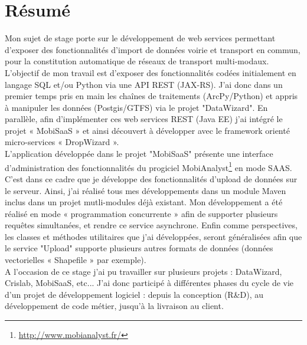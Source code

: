 \chapter*{Résumé}\label{Resume}

Mon sujet de stage porte sur le développement de web services permettant d’exposer des fonctionnalités d’import de données voirie et transport en commun, pour la constitution automatique de réseaux de transport multi-modaux. \\

L'objectif de mon travail est d'exposer des fonctionnalités codées initialement en langage SQL et/ou Python via une API REST (JAX-RS). J'ai donc dans un premier temps pris en main les chaînes de traitements (ArcPy/Python) et appris à manipuler les données (Postgis/GTFS) via le projet "DataWizard". En parallèle, afin d'implémenter ces web services REST (Java EE) j'ai intégré le projet « MobiSaaS » et ainsi découvert à développer avec le framework orienté micro-services « DropWizard ». \\

L'application développée dans le projet "MobiSaaS" présente une interface d'administration des fonctionnalités du progiciel MobiAnalyst\footnote{\url{http://www.mobianalyst.fr/}} en mode SAAS. C'est dans ce cadre que je développe des fonctionnalités d'upload de données sur le serveur. Ainsi, j'ai réalisé tous mes développements dans un module Maven inclus dans un projet mutli-modules déjà existant. Mon développement a été réalisé en mode « programmation concurrente » afin de supporter plusieurs requêtes simultanées, et rendre ce service asynchrone. Enfin comme perspectives, les classes et méthodes utilitaires que j'ai développées, seront généralisées afin que le service "Upload" supporte plusieurs autres formats de données (données vectorielles « Shapefile » par exemple).\\

A l'occasion de ce stage j'ai pu travailler sur plusieurs projets : DataWizard,  Crislab,  MobiSaaS, etc... J'ai donc participé à différentes phases du cycle de vie d'un projet de développement logiciel : depuis la conception (R\&D), au développement de code métier, jusqu'à la livraison au client.\\
